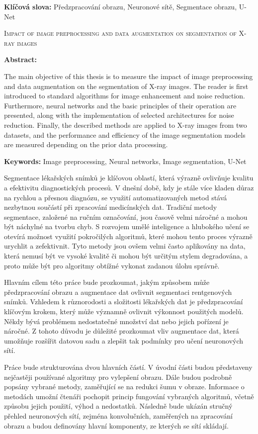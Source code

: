 \documentclass[male,czech,api_ing]{thesis}
\newcommand{\nazeven}{Impact of image preprocessing and data augmentation on segmentation of X-ray images}     %
\begin{document}
\textbf{Klíčová slova:} Předzpracování obrazu, Neuronové sítě, Segmentace obrazu, U-Net

\bigskip


\textsc{\nazeven}

\textbf{Abstract:}

The main objective of this thesis is to measure the impact of image preprocessing and data augmentation on the segmentation of X-ray images. The reader is first introduced to standard algorithms for image enhancement and noise reduction. Furthermore, neural networks and the basic principles of their operation are presented, along with the implementation of selected architectures for noise reduction. Finally, the described methods are applied to X-ray images from two datasets, and the performance and efficiency of the image segmentation models are measured depending on the prior data processing.

\textbf{Keywords:} Image preprocessing, Neural networks, Image segmentation, U-Net

\tableofcontents

Segmentace lékařských snímků je klíčovou oblastí, která výrazně ovlivňuje kvalitu a efektivitu diagnostických procesů. V dnešní době, kdy je stále více kladen důraz na rychlou a přesnou diagnózu, se využití automatizovaných metod stává nezbytnou součástí při zpracování medicínských dat. Tradiční metody segmentace, založené na ručním označování, jsou časově velmi náročné a mohou být náchylné na tvorbu chyb. S rozvojem umělé inteligence a hlubokého učení se otevírá možnost využití pokročilých algoritmů, které mohou tento proces výrazně urychlit a zefektivnit. Tyto metody jsou ovšem velmi často aplikovány na data, která nemusí být ve vysoké kvalitě či mohou být určitým stylem degradována, a proto může být pro algoritmy obtížné vykonat zadanou úlohu správně.

Hlavním cílem této práce bude prozkoumat, jakým způsobem může předzpracování obrazu a augmentace dat ovlivnit segmentaci rentgenových snímků. Vzhledem k různorodosti a složitosti lékařských dat je předzpracování klíčovým krokem, který může významně ovlivnit výkonnost použitých modelů. Někdy bývá problémem nedostatečné množství dat nebo jejich pořízení je náročné. Z tohoto důvodu je důležité prozkoumat vliv augmentace dat, která umožňuje rozšířit datovou sadu a zlepšit tak podmínky pro učení neuronových sítí.

Práce bude strukturována dvou hlavních částí. V úvodní části budou představeny nejčastěji používané algoritmy pro vylepšení obrazu. Dále budou podrobně popsány vybrané metody, zaměřující se na redukci šumu v obraze. Informace o metodách umožní čtenáři pochopit princip fungování vybraných algoritmů, včetně způsobu jejich použití, výhod a nedostatků. Následně bude ukázán stručný přehled neuronových sítí, zejména konvolučních, zaměřených na zpracování obrazu a budou definovány hlavní komponenty, ze kterých se sítí skládají.
\end{document}
